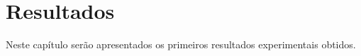 \chapter{Resultados}

Neste capítulo serão apresentados os primeiros resultados experimentais obtidos.
